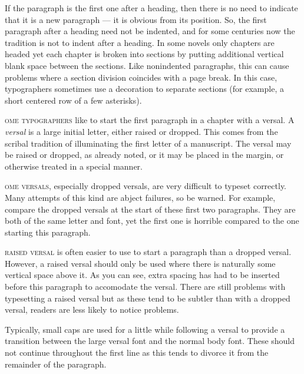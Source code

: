 \documentclass[10pt,letterpaper,extrafontsizes]{memoir}
\begin{document}
    If the paragraph is the first one after a heading, 
then there
is no need to indicate that it is a new paragraph --- it is obvious from its
position. So, the first paragraph after a heading 
need not be indented, and for some centuries now 
the tradition is not to indent after a heading.
In some novels only chapters are headed yet each chapter is broken into
sections by putting additional vertical blank space between the sections.
Like nonindented paragraphs, 
this can cause problems where a section division
coincides with a page break. In this case, typographers sometimes use a
decoration to separate sections (for example, a short centered row of a few
asterisks).
   


\textsc{ome typographers} 
like to start the first paragraph in a chapter
with a versal. A \emph{versal} is a large initial letter, either raised or
dropped. This comes from the scribal tradition of illuminating the first
letter of a manuscript. The versal may be raised or dropped, as already noted,
or it may be placed in the margin, or otherwise treated in 
a special manner.

\textsc{ome versals,} especially dropped versals, are very difficult
to typeset correctly. Many attempts of this kind are abject failures, so
be warned. For example, compare the dropped versals at the start of these
first two paragraphs. They are both of the same letter and font, yet the first
one is horrible compared to the one starting this paragraph.


 \textsc{raised versal} is often easier to use to 
start a paragraph than a dropped versal. 
However, a raised versal should only be used
where there is naturally some vertical space above it. As you can see, extra
spacing has had to be inserted before this paragraph to accomodate the versal.
There are still problems with typesetting a raised versal but as these tend
to be subtler than with a dropped versal, readers are less likely
to notice problems.

Typically, small caps are used for a little while following a versal to 
provide a transition between the large versal font and the normal body font.
These should not continue throughout the first line as this tends to divorce
it from the remainder of the paragraph. 
\end{document}
